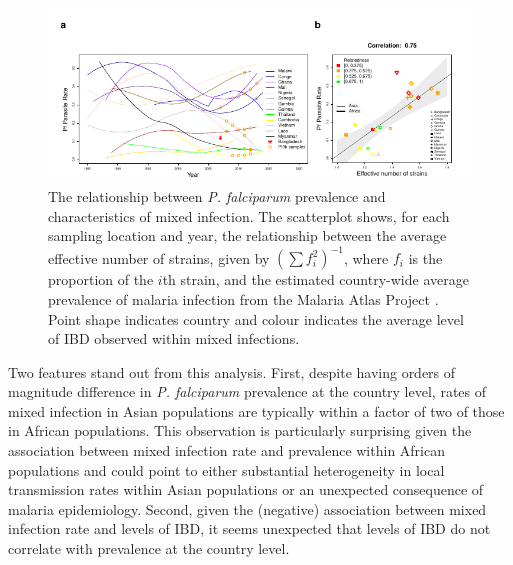 \documentclass[9pt,lineno]{elife}
\begin{document}
\begin{figure}[h]
  \centering{}
    \includegraphics[width=\textwidth]{Fig5.pdf}
  \caption{The relationship between {\it P. falciparum} prevalence and characteristics of mixed infection.  The scatterplot shows, for each sampling location and year, the relationship between the average effective number of strains, given by $(\sum f_i^2)^{-1}$, where $f_i$ is the proportion of the $i$th strain, and the estimated country-wide average prevalence of malaria infection from the Malaria Atlas Project \citep{MAP2017}.  Point shape indicates country and colour indicates the average level of IBD observed within mixed infections. }
  \label{fig:pfpr}
\end{figure}

Two features stand out from this analysis.  First, despite having orders of magnitude difference in {\it P. falciparum} prevalence at the country level, rates of mixed infection in Asian populations are typically within a factor of two of those in African populations.  This observation is particularly surprising given the association between mixed infection rate and prevalence within African populations and could point to either substantial heterogeneity in local transmission rates within Asian populations or an unexpected consequence of malaria epidemiology.  Second, given the (negative) association between mixed infection rate and levels of IBD, it seems unexpected that levels of IBD do not correlate with prevalence at the country level.
\end{document}
